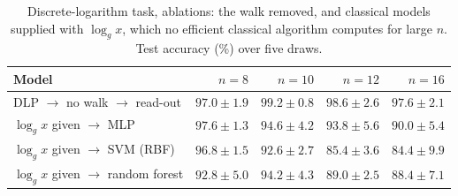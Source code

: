 \begin{table}[htbp]
\centering
\small
\setlength{\tabcolsep}{4pt}
\caption[Discrete-logarithm task: ablations]{Discrete-logarithm task, ablations: the walk removed, and classical models supplied with $\log_g x$, which no efficient classical algorithm computes for large $n$. Test accuracy (\%) over five draws.}
\label{tab:latablation}
\begin{tabular}{lrrrr}
\hline
Model & $n=8$ & $n=10$ & $n=12$ & $n=16$ \\
\hline
DLP $\to$ no walk $\to$ read-out & $97.0 \pm 1.9$ & $99.2 \pm 0.8$ & $98.6 \pm 2.6$ & $97.6 \pm 2.1$ \\
$\log_g x$ given $\to$ MLP & $97.6 \pm 1.3$ & $94.6 \pm 4.2$ & $93.8 \pm 5.6$ & $90.0 \pm 5.4$ \\
$\log_g x$ given $\to$ SVM (RBF) & $96.8 \pm 1.5$ & $92.6 \pm 2.7$ & $85.4 \pm 3.6$ & $84.4 \pm 9.9$ \\
$\log_g x$ given $\to$ random forest & $92.8 \pm 5.0$ & $94.2 \pm 4.3$ & $89.0 \pm 2.5$ & $88.4 \pm 7.1$ \\
\hline
\end{tabular}
\end{table}
